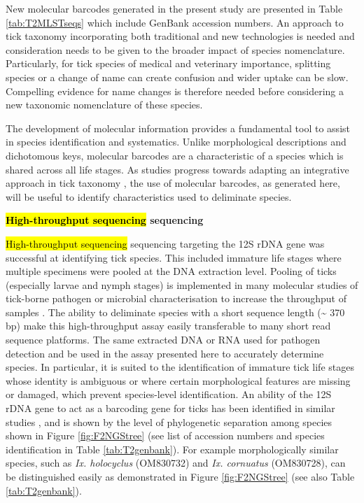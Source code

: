 \documentclass[a4paper, nobind]{templates/ociamthesis}
\begin{document}
New molecular barcodes generated in the present study are presented in Table \ref{tab:T2MLSTseqs} which include GenBank accession numbers.
An approach to tick taxonomy incorporating both traditional and new technologies is needed and consideration needs to be given to the broader impact of species nomenclature.
Particularly, for tick species of medical and veterinary importance, splitting species or a change of name can create confusion and wider uptake can be slow.
Compelling evidence for name changes is therefore needed before considering a new taxonomic nomenclature of these species.

The development of molecular information provides a fundamental tool to assist in species identification and systematics.
Unlike morphological descriptions and dichotomous keys, molecular barcodes are a characteristic of a species which is shared across all life stages.
As studies progress towards adapting an integrative approach in tick taxonomy \autocite{dantas-torresSpeciesConceptsWhat2018}, the use of molecular barcodes, as generated here, will be useful to identify characteristics used to deliminate species.

\textbf{\hl{High-throughput sequencing} sequencing}

\hl{High-throughput sequencing} sequencing targeting the 12S rDNA gene was successful at identifying tick species.
This included immature life stages where multiple specimens were pooled at the DNA extraction level.
Pooling of ticks (especially larvae and nymph stages) is implemented in many molecular studies of tick-borne pathogen or microbial characterisation to increase the throughput of samples \autocite{estrada-penaPitfallsTickTickBorne2021}.
The ability to deliminate species with a short sequence length (\textasciitilde{} 370 bp) make this high-throughput assay easily transferable to many short read sequence platforms.
The same extracted DNA or RNA used for pathogen detection and be used in the assay presented here to accurately determine species.
In particular, it is suited to the identification of immature tick life stages whose identity is ambiguous or where certain morphological features are missing or damaged, which prevent species-level identification.
An ability of the 12S rDNA gene to act as a barcoding gene for ticks has been identified in similar studies \autocite{lvAssessmentFourDNA2014,kandumaMitochondrialNuclearMultilocus2019}, and is shown by the level of phylogenetic separation among species shown in Figure \ref{fig:F2NGStree} (see list of accession numbers and species identification in Table \ref{tab:T2genbank}).
For example morphologically similar species, such as \emph{Ix. holocyclus} (OM830732) and \emph{Ix. cornuatus} (OM830728), can be distinguished easily as demonstrated in Figure \ref{fig:F2NGStree} (see also Table \ref{tab:T2genbank}).
\end{document}
